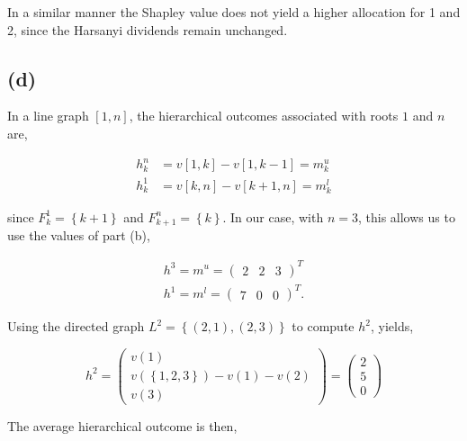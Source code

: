 \documentclass[american]{scrartcl}
\newcommand{\set}[1]{\left\{#1\right\}}
\begin{document}
In a similar manner the Shapley value does not yield a higher allocation for 1 and 2, since the Harsanyi dividends remain unchanged.

\subsection*{(d)}


In a line graph $[1, n]$, the hierarchical outcomes associated with roots $1$ and $n$ are,

\begin{equation}
    \begin{split}
        h^n_k &= v[1, k] - v[1, k - 1] = m^u_k \\
        h^1_k &= v[k, n] - v[k+1, n] = m^l_k
    \end{split}
\end{equation}

since $F^1_k = \set{k + 1}$ and $F^n_{k + 1} = \set{k}$. In our case, with $n = 3$, this allows us to use the values of part (b),

\begin{equation}
    \begin{split}
        h^3 = m^u = \begin{pmatrix}
            2 &
            2 &
            3
        \end{pmatrix}^T \\
        h^1 = m^l = \begin{pmatrix}
            7 &
            0 &
            0
        \end{pmatrix}^T.
    \end{split}
\end{equation}

Using the directed graph $L^2 = \set{(2, 1), (2, 3)}$ to compute $h^2$,  yields,

\begin{equation}
    h^2 = \begin{pmatrix}
        v(1) \\ v(\set{1,2,3}) - v(1) - v(2) \\ v(3)
    \end{pmatrix} = \begin{pmatrix}
        2 \\ 5 \\ 0
    \end{pmatrix}
\end{equation}

The average hierarchical outcome is then,
\end{document}
